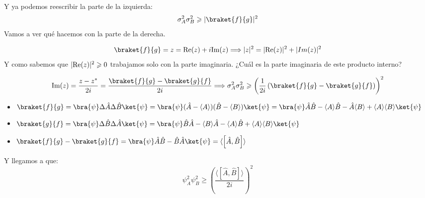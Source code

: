 \documentclass{report}
\begin{document}
    \noindent Y ya podemos reescribir la parte de la izquierda:
    \[\sigma_A^2\sigma_B^2\geq\abs{\braket{f}{g}}^2\]
    \noindent Vamos a ver qué hacemos con la parte de la derecha.

    \[\braket{f}{g}=z=\text{Re}(z)+i\text{Im}(z)\Longrightarrow \abs{z}^2
    =\abs{\text{Re}(z)}^2+\abs{Im(z)}^2\]
    \noindent Y como sabemos que $\lvert\text{Re}(z)\rvert^2\geqslant 0$ trabajamos solo
    con la parte imaginaria. ¿Cuál es la parte imaginaria de este producto interno?

    \[\text{Im}(z)=\dfrac{z-z^*}{2i}=\dfrac{\braket{f}{g}-\braket{g}{f}}{2i}
    \Longrightarrow\sigma_A^2\sigma_B^2\geq\left(\dfrac{1}{2i}\left(\braket{f}{g}-
    \braket{g}{f}\right)\right)^2\]
    
    \begin{itemize}
      \item $\braket{f}{g}=\bra{\psi}\Delta\hat{A}\Delta\hat{B}\ket{\psi}=
            \bra{\psi}(\hat{A}-\langle A\rangle)(\hat{B}-
            \langle B\rangle)\ket{\psi}=\bra{\psi}\hat{A}\hat{B}-
            \langle A\rangle\hat{B}-\hat{A}\langle B\rangle+\langle A\rangle
            \langle B\rangle\ket{\psi}$
      \item $\braket{g}{f}=\bra{\psi}\Delta\hat{B}\Delta\hat{A}\ket{\psi}=
            \bra{\psi}\hat{B}\hat{A}-\langle B\rangle\hat{A}-\langle A\rangle\hat{B}
            +\langle A\rangle\langle B\rangle\ket{\psi}$
      \item $\braket{f}{g}-\braket{g}{f}=\bra{\psi}\hat{A}\hat{B}-\hat{B}\hat{A}\ket{\psi}=
            \langle\left[\hat{A},\hat{B}\right]\rangle$
    \end{itemize}

    \noindent Y llegamos a que:
    \[\boxed{\psi_A^2\psi_B^2\geq\left(\dfrac{\langle\left[\hat{A},\hat{B}\right]\rangle}{2i}\right)^2}\]

\end{document}

